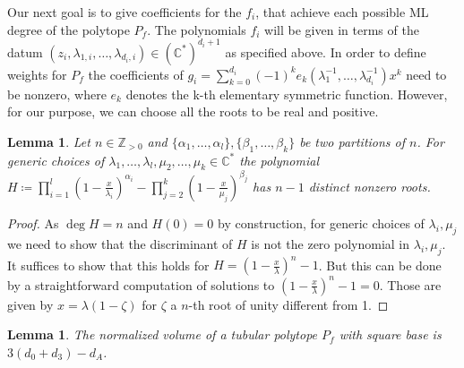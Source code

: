 \documentclass[12pt,reqno]{amsart}   	%
\theoremstyle{plain}
\newtheorem{lemma}[theorem]{Lemma}
\theoremstyle{definition}
\theoremstyle{remark}
\newcommand{\Z}{\mathbb{Z}}
\newcommand{\C}{\mathbb{C}}
\begin{document}
Our next goal is to give coefficients for the $f_i$, that achieve each possible ML degree of  the polytope $P_f$. 
The polynomials $f_i$ will be given in terms of the datum $(z_i, \lambda_{1,i},\ldots,\lambda_{d_i,i}) \in (\C^{\ast})^{d_i+1}$ as specified above. In order to define weights for $P_f$ the coefficients of $g_i = \sum_{k=0}^{d_i} (-1)^k e_k(\lambda_1^{-1},\dots,\lambda_{d_i}^{-1})x^k$ need to be nonzero, where $e_k$ denotes the k-th elementary symmetric function. However, for our purpose, we can choose all the roots to be real and positive. 
\begin{lemma}\label{lem:technical}
    Let $n\in \Z_{>0}$ and $\{\alpha_1,\dots ,\alpha_l\} ,\{\beta_1,\dots,\beta_k \}$ be two partitions of $n$. For generic choices of $\lambda_1,\dots,\lambda_l,\mu_2,\dots,\mu_k \in \C^\ast$ the polynomial $H\coloneqq \prod _{i=1}^{l}(1-\frac{x}{\lambda_i})^{\alpha_i} - \prod_{j=2}^k (1-\frac{x}{\mu_j})^{\beta_j}$ has $n-1$ distinct nonzero roots.
\end{lemma}
\begin{proof}
    As $\deg H= n$ and $H(0) = 0$ by construction, for generic choices of $\lambda _i, \mu _j$ we need to show that the discriminant of $H$ is not the zero polynomial in $\lambda_i,\mu_j$. It suffices to show that this holds for $H=(1- \frac{x}{\lambda})^n- 1$. But this can be done by a straightforward computation of solutions to $(1-\frac{x}{\lambda})^n-1 = 0$. Those are given by $x=\lambda(1-\zeta)$ for $\zeta$ a $n$-th root of unity different from 1.
\end{proof}
\begin{lemma}
    The normalized volume of a tubular polytope $P_f$ with square base  is $3(d_0+d_3)-d_A$.
\end{lemma}
\end{document}
